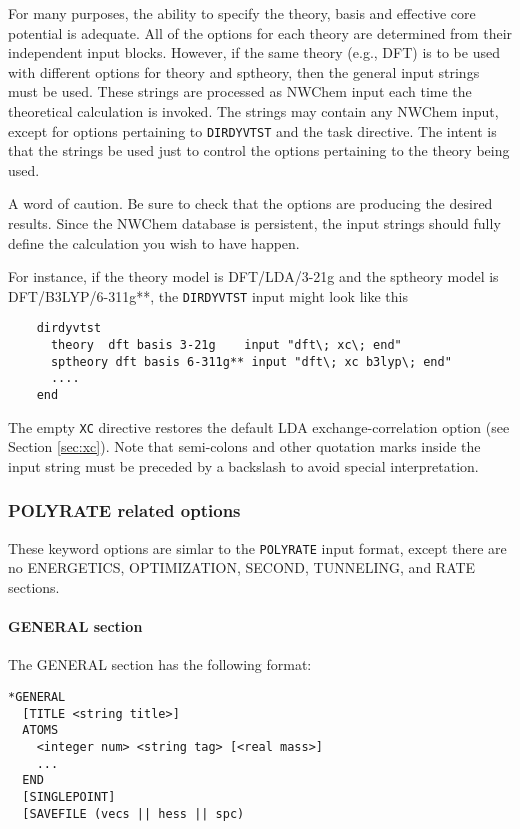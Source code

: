 For many purposes, the ability to specify the theory, basis and
effective core potential is adequate.  All of the options for each
theory are determined from their independent input blocks.  However,
if the same theory (e.g., DFT) is to be used with different options
for theory and sptheory, then the general input strings must
be used.  These strings are processed as NWChem input each time the
theoretical calculation is invoked.  The strings may contain any NWChem
input, except for options pertaining to \verb+DIRDYVTST+ and the task directive.
The intent is that the strings be used just to control the options
pertaining to the theory being used.

A word of caution.  Be sure to check that the options are producing
the desired results.  Since the NWChem database is persistent,
the input strings should fully define the calculation you wish to have happen.

For instance, if the theory model is DFT/LDA/3-21g and the
sptheory model is DFT/B3LYP/6-311g**, the \verb+DIRDYVTST+ input might look like this
\begin{verbatim}
    dirdyvtst
      theory  dft basis 3-21g    input "dft\; xc\; end"
      sptheory dft basis 6-311g** input "dft\; xc b3lyp\; end"
      ....
    end
\end{verbatim}
The empty \verb+XC+ directive restores the default LDA
exchange-correlation option (see Section \ref{sec:xc}).  Note that
semi-colons and other quotation marks inside the input string must be
preceded by a backslash to avoid special interpretation.

\subsubsection{POLYRATE related options}

These keyword options are simlar to the \verb+POLYRATE+ input format, except there
are no ENERGETICS, OPTIMIZATION, SECOND, TUNNELING, and RATE sections.

\paragraph{GENERAL section}


The GENERAL section has the following format:

\begin{verbatim}
*GENERAL
  [TITLE <string title>]
  ATOMS
    <integer num> <string tag> [<real mass>]
    ...
  END
  [SINGLEPOINT]
  [SAVEFILE (vecs || hess || spc)
\end{verbatim}

